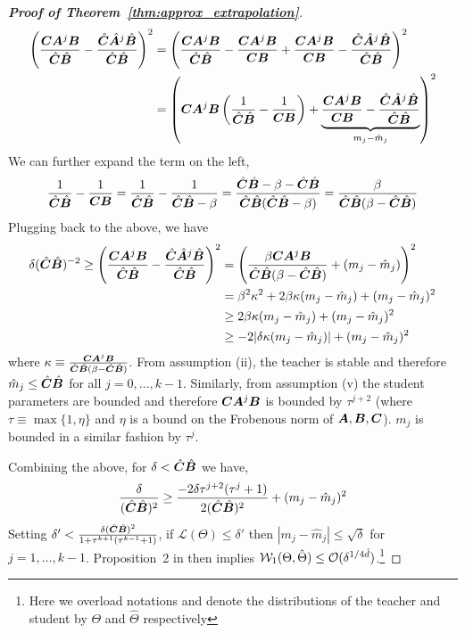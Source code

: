 \begin{proof}[\textbf{Proof of Theorem~\ref{thm:approx_extrapolation}}]
\begin{align}
    \left( \frac{\mC\mA^j\mB}{\hat{\mC}\hat{\mB}} -\frac{\hat{\mC}\hat{\mA}^j\hat{\mB}}{\hat{\mC}\hat{\mB}}\right)^2 & = \left( \frac{\mC\mA^j\mB}{\hat{\mC}\hat{\mB}} - \frac{\mC\mA^j\mB}{\mC\mB} + \frac{\mC\mA^j\mB}{\mC\mB} -\frac{\hat{\mC}\hat{\mA}^j\hat{\mB}}{\hat{\mC}\hat{\mB}}\right)^2\\
    & = \left( \mC\mA^j\mB\left(\frac{1}{\hat{\mC}\hat{\mB}} - \frac{1}{\mC\mB}\right) + \underbrace{\frac{\mC\mA^j\mB}{\mC\mB} -\frac{\hat{\mC}\hat{\mA}^j\hat{\mB}}{\hat{\mC}\hat{\mB}}}_{m_j-\hat{m}_j}\right)^2 %
\end{align}
We can further expand the term on the left,
\begin{equation}
    \frac{1}{\hat{{\bm{C}}}\hat{{\bm{B}}}} - \frac{1}{{\bm{C}}{\bm{B}}}=\frac{1}{\hat{{\bm{C}}}\hat{{\bm{B}}}}-\frac{1}{\hat{{\bm{C}}}\hat{{\bm{B}}}-\beta}=\frac{\hat{{\bm{C}}}\hat{{\bm{B}}}-\beta - \hat{{\bm{C}}}\hat{{\bm{B}}}}{\hat{{\bm{C}}}\hat{{\bm{B}}}(\hat{{\bm{C}}}\hat{{\bm{B}}}-\beta)}=\frac{\beta}{\hat{{\bm{C}}}\hat{{\bm{B}}}(\beta-\hat{{\bm{C}}}\hat{{\bm{B}}})}
\end{equation}
Plugging back to the above, we have
\begin{align}
    \delta(\hat{{\bm{C}}}\hat{{\bm{B}}})^{-2}\geq\left( \frac{{\bm{C}}{\bm{A}}^j{\bm{B}}}{\hat{{\bm{C}}}\hat{{\bm{B}}}} -\frac{\hat{{\bm{C}}}\hat{{\bm{A}}}^j\hat{{\bm{B}}}}{\hat{{\bm{C}}}\hat{{\bm{B}}}}\right)^2 & =\left(\frac{\beta{\bm{C}}{\bm{A}}^j{\bm{B}}}{\hat{{\bm{C}}}\hat{{\bm{B}}}(\beta-\hat{{\bm{C}}}\hat{{\bm{B}}})} + (m_j-\hat{m}_j) \right)^2\\
    & = \beta^2\kappa^2+2\beta\kappa(m_j-\hat{m}_j) + (m_j-\hat{m}_j)^2\\
    & \geq 2\beta\kappa(m_j-\hat{m}_j) + (m_j-\hat{m}_j)^2\\
    & \geq -2|\delta\kappa(m_j-\hat{m}_j)| + (m_j-\hat{m}_j)^2
\end{align}
where $\kappa\equiv \frac{{\bm{C}}{\bm{A}}^j{\bm{B}}}{\hat{{\bm{C}}}\hat{{\bm{B}}}(\beta-\hat{{\bm{C}}}\hat{{\bm{B}}})}$. From assumption (ii), the teacher is stable and therefore $\hat{m}_j\le \hat{{\bm{C}}}\hat{{\bm{B}}}$ for all $j=0,\dots,k-1$. Similarly, from assumption (v) the student parameters are bounded and therefore ${\bm{C}}{\bm{A}}^j{\bm{B}}$ is bounded by $\tau^{j+2}$ (where $\tau\equiv \max\lbrace 1, \eta \rbrace$ and $\eta$ is a bound on the Frobenous norm of ${\bm{A}},{\bm{B}},{\bm{C}}$). $m_j$ is bounded in a similar fashion by $\tau^j$.

Combining the above, for $\delta<\hat{{\bm{C}}}\hat{{\bm{B}}}$ we have,
\begin{equation}
    \frac{\delta}{(\hat{{\bm{C}}}\hat{{\bm{B}}})^2}\geq \frac{-2\delta \tau^{j+2}(\tau^j+1)}{2(\hat{{\bm{C}}}\hat{{\bm{B}}})^2}+(m_j-\hat{m}_j)^2
\end{equation}
Setting $\delta'<\frac{\delta(\hat{{\bm{C}}}\hat{{\bm{B}}})^2}{1+\tau^{k+1}(\tau^{k-1}+1)}$, if $\mathcal{L}(\Theta)\leq\delta'$ then $|m_j-\hat{m}_j|\le \sqrt{\delta}$ for $j=1,\dots,k-1$. Proposition~2 in \cite{wu2020optimal} then implies $\mathcal{W}_1(\Theta,\hat{\Theta}) \leq \mathcal{O} ( \delta^{1 / 4 \hat{d}} )$.\footnote{Here we overload notations and denote the distributions of the teacher and student by $\Theta$ and $\hat{\Theta}$ respectively}


\end{proof}

